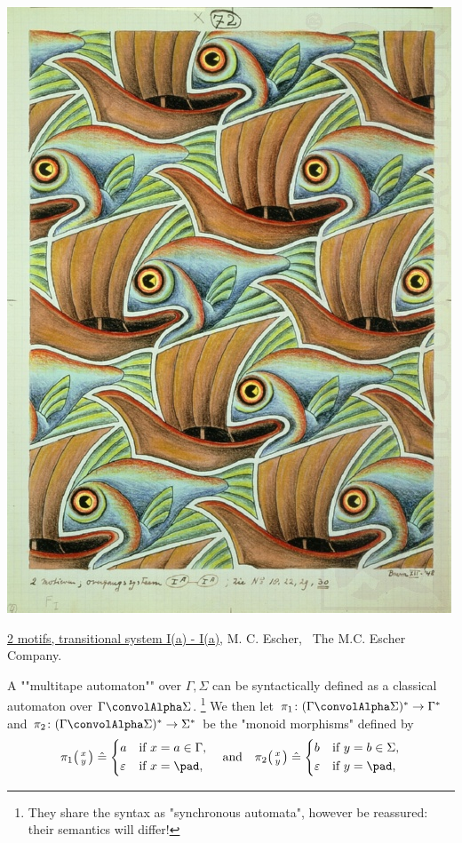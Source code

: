 \begin{marginfigure}[-30em]
	\centering
	\includegraphics[width=\linewidth]{fig/escher/2-motifs-transitional-system.jpg}
	\caption{\href{https://mcescher.com/gallery/symmetry/\#iLightbox[gallery\_image\_1]/57}{2 motifs, transitional system I(a) - I(a)}, M. C. Escher, \textcopyright~The M.C. Escher Company.}	
\end{marginfigure}
A \AP""multitape automaton"" over $\Gamma,\Sigma$
can be syntactically defined as a classical automaton over $\Gamma \convolAlpha \Sigma$.%
\footnote{They share the syntax as "synchronous automata", however be reassured: their semantics will differ!}
We then let $\pi_1\colon (\Gamma\convolAlpha\Sigma)^* \to \Gamma^*$ and 
$\pi_2\colon (\Gamma\convolAlpha\Sigma)^* \to \Sigma^*$ be the "monoid morphisms"
defined by
\[
	\pi_1\pair{x}{y}\defeq \begin{cases*}
		a & \text{if $x = a \in \Gamma$,}\\
		\varepsilon & \text{if $x=\pad$,}
	\end{cases*}
	\quad\text{and}\quad
	\pi_2\pair{x}{y}\defeq \begin{cases*}
		b & \text{if $y = b \in \Sigma$,}\\
		\varepsilon & \text{if $y=\pad$,}
	\end{cases*}
\]
